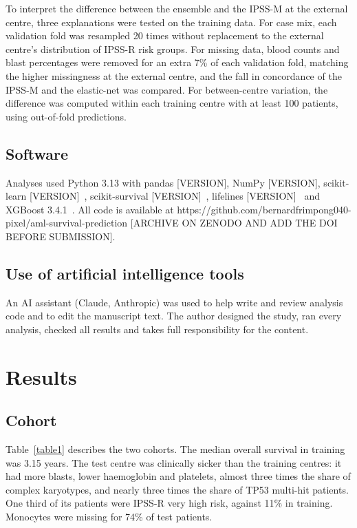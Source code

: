 \documentclass[10pt,letterpaper]{article}
\begin{document}
To interpret the difference between the ensemble and the IPSS-M at the external centre,
three explanations were tested on the training data. For case mix, each validation fold was
resampled 20 times without replacement to the external centre's distribution of IPSS-R risk
groups. For missing data, blood counts and blast percentages were removed for an extra 7\%
of each validation fold, matching the higher missingness at the external centre, and the
fall in concordance of the IPSS-M and the elastic-net was compared. For between-centre
variation, the difference was computed within each training centre with at least 100
patients, using out-of-fold predictions.

\subsection*{Software}
Analyses used Python 3.13 with pandas [VERSION], NumPy [VERSION], scikit-learn
[VERSION]~\cite{pedregosa2011}, scikit-survival [VERSION]~\cite{polsterl2020},
lifelines [VERSION]~\cite{lifelines2019} and XGBoost 3.4.1~\cite{chen2016}. All code is
available at https://github.com/bernardfrimpong040-pixel/aml-survival-prediction
[ARCHIVE ON ZENODO AND ADD THE DOI BEFORE SUBMISSION].

\subsection*{Use of artificial intelligence tools}
An AI assistant (Claude, Anthropic) was used to help write and review analysis code and
to edit the manuscript text. The author designed the study, ran every analysis, checked
all results and takes full responsibility for the content.

\section*{Results}

\subsection*{Cohort}
Table~\ref{table1} describes the two cohorts. The median overall survival in training was
3.15 years. The test centre was clinically sicker than the training centres: it had more
blasts, lower haemoglobin and platelets, almost three times the share of complex
karyotypes, and nearly three times the share of TP53 multi-hit patients. One third of its
patients were IPSS-R very high risk, against 11\% in training. Monocytes were missing for
74\% of test patients.
\end{document}
